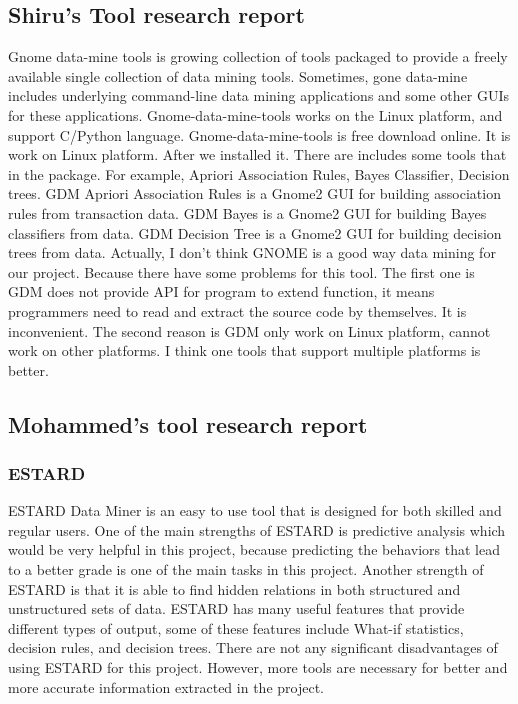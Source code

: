 \documentclass[12pt]{article}
\begin{document}
	\subsection{Shiru's Tool research report} \label{app_shi}
	Gnome data-mine tools is growing collection of tools packaged to provide a freely available single collection of data mining tools. Sometimes, gone data-mine includes underlying command-line data mining applications and some other GUIs for these applications.	Gnome-data-mine-tools works on the Linux platform, and support C/Python language. Gnome-data-mine-tools is free download online. It is work on Linux platform. After we installed it. There are includes some tools that in the package. For example, Apriori Association Rules, Bayes Classifier, Decision trees. GDM Apriori Association Rules is a Gnome2 GUI for building association rules from transaction data. GDM Bayes is a Gnome2 GUI for building Bayes classifiers from data. GDM Decision Tree is a Gnome2 GUI for building decision trees from data.
	Actually, I don’t think GNOME is a good way data mining for our project. Because there have some problems for this tool. The first one is GDM does not provide API for program to extend function, it means programmers need to read and extract the source code by themselves. It is inconvenient. The second reason is GDM only work on Linux platform, cannot work on other platforms. I think one tools that support multiple platforms is better.
	\subsection{Mohammed's tool research report} \label{app_mo}
	\subsubsection{ESTARD} \label{est}
	ESTARD Data Miner is an easy to use tool that is designed for both skilled and regular users. One of the main strengths of ESTARD is predictive analysis which would be very helpful in this project, because predicting the behaviors that lead to a better grade is one of the main tasks in this project. Another strength of ESTARD is that it is able to find hidden relations in both structured and unstructured sets of data. ESTARD has many useful features that provide different types of output, some of these features include What-if statistics, decision rules, and decision trees.  There are not any significant disadvantages of using ESTARD for this project. However, more tools are necessary for better and more accurate information extracted in the project.
\end{document}

